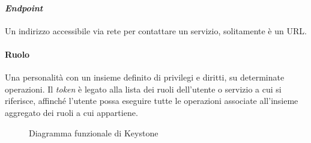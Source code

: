 \paragraph{\textit{Endpoint}}
Un indirizzo accessibile via rete per contattare un servizio, solitamente è un URL.\cite{KeystoneConcepts}
\paragraph{Ruolo}
Una personalità con un insieme definito di privilegi e diritti, su determinate operazioni.
Il \textit{token} è legato alla lista dei ruoli dell'utente o servizio a cui si riferisce, affinché l'utente possa eseguire tutte le operazioni associate all'insieme aggregato dei ruoli a cui appartiene.\cite{KeystoneConcepts}

\begin{figure}[H]
\centering
{}
\caption{Diagramma funzionale di Keystone\cite{KeystoneConcepts}}\label{openstackkeystone}
\end{figure}

